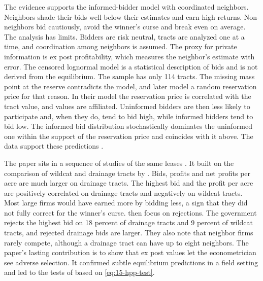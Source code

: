  The evidence supports the informed-bidder model with
coordinated neighbors. Neighbors shade their bids well below their estimates and earn high returns. Non-neighbors
bid cautiously, avoid the winner's curse and break even on average. The analysis has limits. Bidders are risk
neutral, tracts are analyzed one at a time, and coordination among neighbors is assumed. The proxy for private
information is ex post profitability, which measures the neighbor's estimate with error. The censored lognormal
model is a statistical description of bids and is not derived from the equilibrium. The sample has only 114
tracts. The missing mass point at the reserve contradicts the model, and \citet{HendricksPorterWilson1994}
later model a random reservation price for that reason. In their model the reservation price is correlated
with the tract value, and values are affiliated. Uninformed bidders are then less likely to participate and,
when they do, tend to bid high, while informed bidders tend to bid low. The informed bid distribution
stochastically dominates the uninformed one within the support of the reservation price and coincides with it
above. The data support these predictions \citep[p.~125]{HortacsuPerrigne2021}.

The paper sits in a sequence of studies of the same leases \citep[pp.~124--125]{HortacsuPerrigne2021}. It
built on the comparison of wildcat and drainage tracts by \citet{HendricksPorterBoudreau1987}. Bids, profits
and net profits per acre are much larger on drainage tracts. The highest bid and the profit per acre are
positively correlated on drainage tracts and negatively on wildcat tracts. Most large firms would have earned
more by bidding less, a sign that they did not fully correct for the winner's curse.
\citet{HendricksPorterSpady1989} then focus on rejections. The government rejects the highest bid on 18
percent of drainage tracts and 9 percent of wildcat tracts, and rejected drainage bids are larger. They also
note that neighbor firms rarely compete, although a drainage tract can have up to eight neighbors. The
paper's lasting contribution is to show that ex post values let the econometrician see adverse selection. It
confirmed subtle equilibrium predictions in a field setting and led to the tests of
\citet{HendricksPinksePorter2003} based on \eqref{eq:15-hpp-test}.
